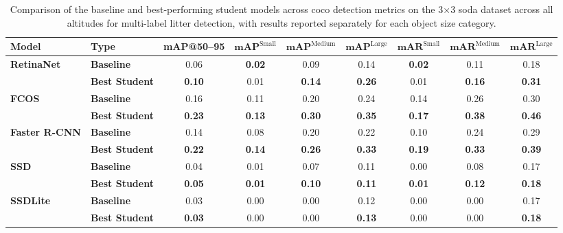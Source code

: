 \begin{table*}[htbp]
\centering
\renewcommand{\arraystretch}{1.5} %
\begin{adjustbox}{width=\textwidth}
\begin{tabular}{llccccccc}
\hline
\textbf{Model} & \textbf{Type} & \textbf{mAP@50--95} & \(\mathbf{mAP}^{\text{Small}}\) & \(\mathbf{mAP}^{\text{Medium}}\) & \(\mathbf{mAP}^{\text{Large}}\) & \(\mathbf{mAR}^{\text{Small}}\) & \(\mathbf{mAR}^{\text{Medium}}\) & \(\mathbf{mAR}^{\text{Large}}\) \\ \hline
\multirow{2}{*}{\textbf{RetinaNet}} 
 & \textbf{Baseline}      & 0.06 & \textbf{0.02} & 0.09 & 0.14 & \textbf{0.02} & 0.11 & 0.18 \\
 & \textbf{Best Student}  & \textbf{0.10} & 0.01 & \textbf{0.14} & \textbf{0.26} & 0.01 & \textbf{0.16} & \textbf{0.31} \\ \hline
\multirow{2}{*}{\textbf{FCOS}} 
 & \textbf{Baseline}      & 0.16 & 0.11 & 0.20 & 0.24 & 0.14 & 0.26 & 0.30 \\
 & \textbf{Best Student}  & \textbf{0.23} & \textbf{0.13} & \textbf{0.30} & \textbf{0.35} & \textbf{0.17} & \textbf{0.38} & \textbf{0.46} \\ \hline
\multirow{2}{*}{\textbf{Faster R-CNN}} 
 & \textbf{Baseline}      & 0.14 & 0.08 & 0.20 & 0.22 & 0.10 & 0.24 & 0.29 \\
 & \textbf{Best Student}  & \textbf{0.22} & \textbf{0.14} & \textbf{0.26} & \textbf{0.33} & \textbf{0.19} & \textbf{0.33} & \textbf{0.39} \\ \hline
\multirow{2}{*}{\textbf{SSD}} 
 & \textbf{Baseline}      & 0.04 & 0.01 & 0.07 & 0.11 & 0.00 & 0.08 & 0.17 \\
 & \textbf{Best Student}  & \textbf{0.05} & \textbf{0.01} & \textbf{0.10} & \textbf{0.11} & \textbf{0.01} & \textbf{0.12} & \textbf{0.18} \\ \hline
\multirow{2}{*}{\textbf{SSDLite}} 
 & \textbf{Baseline}      & 0.03 & 0.00 & 0.00 & 0.12 & 0.00 & 0.00 & 0.17 \\
 & \textbf{Best Student}  & \textbf{0.03} & 0.00 & 0.00 & \textbf{0.13} & 0.00 & 0.00 & \textbf{0.18} \\ \hline
\end{tabular}
\end{adjustbox}
\caption{Comparison of the baseline and best‐performing student models across \gls{coco} detection metrics on the 3$\times$3 \gls{soda} dataset across all altitudes for multi-label litter detection, with results reported separately for each object size category.}
\label{tab:soda_tiled_multi_object_sizes_split}
\end{table*}

